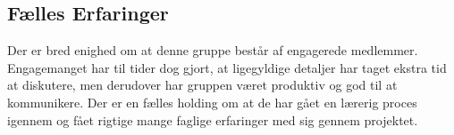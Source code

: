 \subsection{Fælles Erfaringer}
Der er bred enighed om at denne gruppe består af engagerede medlemmer. Engagemanget har til tider dog gjort, at ligegyldige detaljer har taget ekstra tid at diskutere, men derudover har gruppen været produktiv og god til at kommunikere. Der er en fælles holding om at de har gået en lærerig proces igennem og fået rigtige mange faglige erfaringer med sig gennem projektet.